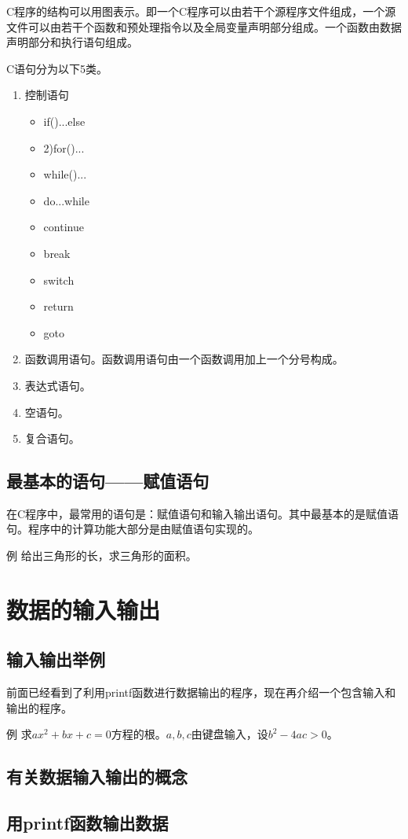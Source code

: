C程序的结构可以用图表示。即一个C程序可以由若干个源程序文件组成，一个源文件可以由若干个函数和预处理指令以及全局变量声明部分组成。一个函数由数据声明部分和执行语句组成。

C语句分为以下5类。
\begin{enumerate}
	\item 控制语句
	\begin{itemize}
		\item if()...else
		\item 2)for()...
		\item while()...
		\item do...while
		\item continue
		\item break
		\item switch
		\item return 
		\item goto
	\end{itemize}
	\item 函数调用语句。函数调用语句由一个函数调用加上一个分号构成。
	\item 表达式语句。
	\item 空语句。
	\item 复合语句。
\end{enumerate}
\subsection{最基本的语句——赋值语句}
在C程序中，最常用的语句是：赋值语句和输入输出语句。其中最基本的是赋值语句。程序中的计算功能大部分是由赋值语句实现的。

例 给出三角形的长，求三角形的面积。

\section{数据的输入输出}
\subsection{输入输出举例}
前面已经看到了利用printf函数进行数据输出的程序，现在再介绍一个包含输入和输出的程序。

例 求$ax^2 + bx + c = 0$方程的根。$a, b, c$由键盘输入，设$b^2 - 4ac > 0$。
\subsection{有关数据输入输出的概念}
\subsection{用printf函数输出数据}
